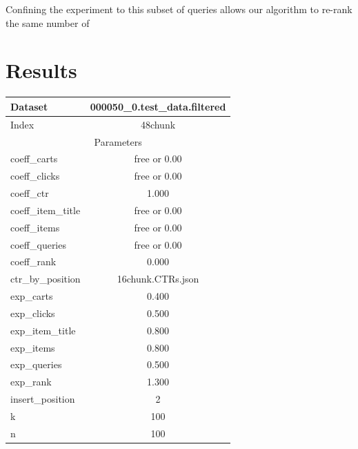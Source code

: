 \documentclass{article}
\begin{document}
Confining the experiment to this subset of queries allows our algorithm to
re-rank the same number of 

\section{Results}

\begin{center}
    \begin{tabular}{| l | c |}
        \hline
        Dataset & 000050\_0.test\_data.filtered \\ \hline
        Index & 48chunk \\ \hline
        \hline
        \multicolumn{2}{|c|}{Parameters} \\ \hline
        coeff\_carts & free or 0.00 \\ \hline
        coeff\_clicks & free or 0.00 \\ \hline
        coeff\_ctr & 1.000 \\ \hline
        coeff\_item\_title & free or 0.00 \\ \hline
        coeff\_items & free or 0.00 \\ \hline
        coeff\_queries & free or 0.00 \\ \hline
        coeff\_rank & 0.000 \\ \hline
        ctr\_by\_position & 16chunk.CTRs.json \\ \hline
        exp\_carts & 0.400 \\ \hline
        exp\_clicks & 0.500 \\ \hline
        exp\_item\_title & 0.800 \\ \hline
        exp\_items & 0.800 \\ \hline
        exp\_queries & 0.500 \\ \hline
        exp\_rank & 1.300 \\ \hline
        insert\_position & 2 \\ \hline
        k & 100 \\ \hline
        n & 100 \\ \hline
  \end{tabular}
\end{center}
\end{document}

